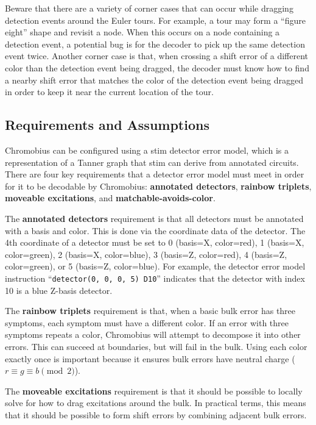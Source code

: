 \documentclass[onecolumn,unpublished,a4paper]{quantumarticle}
\theoremstyle{definition}
\theoremstyle{definition}
\theoremstyle{definition}
\begin{document}
Beware that there are a variety of corner cases that can occur while dragging detection events around the Euler tours.
For example, a tour may form a ``figure eight'' shape and revisit a node.
When this occurs on a node containing a detection event, a potential bug is for the decoder to pick up the same detection event twice.
Another corner case is that, when crossing a shift error of a different color than the detection event being dragged, the decoder must know how to find a nearby shift error that matches the color of the detection event being dragged in order to keep it near the current location of the tour.


\subsection{Requirements and Assumptions}
\label{sec:chromobius-usage}

Chromobius can be configured using a stim detector error model, which is a representation of a Tanner graph that stim can derive from annotated circuits.
There are four key requirements that a detector error model must meet in order for it to be decodable by Chromobius: \textbf{annotated detectors}, \textbf{rainbow triplets}, \textbf{moveable excitations}, and \textbf{matchable-avoids-color}.

The \textbf{annotated detectors} requirement is that all detectors must be annotated with a basis and color.
This is done via the coordinate data of the detector.
The 4th coordinate of a detector must be set to 0 (basis=X, color=red), 1 (basis=X, color=green), 2 (basis=X, color=blue), 3 (basis=Z, color=red), 4 (basis=Z, color=green), or 5 (basis=Z, color=blue).
For example, the detector error model instruction ``\texttt{detector(0, 0, 0, 5) D10}'' indicates that the detector with index 10 is a blue Z-basis detector.

The \textbf{rainbow triplets} requirement is that, when a basic bulk error has three symptoms, each symptom must have a different color.
If an error with three symptoms repeats a color, Chromobius will attempt to decompose it into other errors.
This can succeed at boundaries, but will fail in the bulk.
Using each color exactly once is important because it ensures bulk errors have neutral charge ($r \equiv g \equiv b \pmod{2}$).

The \textbf{moveable excitations} requirement is that it should be possible to locally solve for how to drag excitations around the bulk.
In practical terms, this means that it should be possible to form shift errors by combining adjacent bulk errors.
\end{document}
